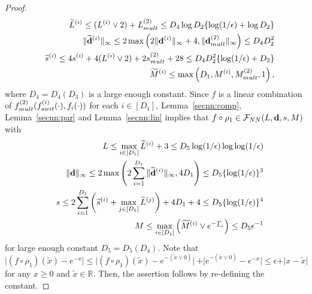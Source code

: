 \documentclass[10pt,a4paper]{amsart}
\newcommand{\bbR}{{\mathbb R}}
\newcommand{\bd}{{\bf d}}
\newcommand{\bean}{\setlength\arraycolsep{1pt}\begin{eqnarray*}}
\def\cF{\mathcal F}
\newcommand{\eean}{\end{eqnarray*}}
\begin{document}
\begin{proof}
\bean
&& \widetilde L^{(i)} \leq (L^{(i)} \vee 2) + L_{\rm mult}^{(2)} \leq D_4 \log D_2  \{ \log (1/\epsilon) + \log D_2 \} 
\\
&& \| \widetilde \bd^{(i)} \|_{\infty} \leq 2\max \left( 2\|\bd^{(i)}\|_{\infty} + 4 ,  \|\bd_{\rm mult}^{(2)}\|_{\infty}   \right) \leq D_4 D_2^2
\\
&& \widetilde s^{(i)} \leq 4 s^{(i)} + 4 (L^{(i)} \vee 2) + 2 s_{\rm mult}^{(2)} + 28  \leq D_4 D_2^{2}  \{ \log (1/\epsilon) +  D_2 \} 
\\
&& \widetilde M^{(i)} \leq \max\left(D_1, M^{(i)}, M_{\rm mult}^{(2)}, 1 \right),
\eean
where $D_4 = D_4(D_3)$ is a large enough constant.
Since $f$ is a linear combination of $f_{\rm mult}^{(2)}(f_{\rm swit}^{(i)}(\cdot) , f_{i}(\cdot))$ for each $i \in [D_1]$, Lemma~\ref{secnn:comp}, Lemma~\ref{secnn:par} and Lemma~\ref{secnn:lin} implies that $f \circ \rho_{1} \in \cF_{\rm NN}(L,\bd,s,M)$ with
\bean
&& L \leq \max_{i \in [D_1]} \widetilde L^{(i)} + 3 \leq D_5 \log(1/\epsilon) \log \log (1/\epsilon)
\\
&& \|\bd\|_{\infty} \leq 2\max\left( 2\sum_{i=1}^{D_1} \| \widetilde \bd^{(i)}\|_{\infty}, 4 D_1 \right) \leq D_5  \{ \log(1/\epsilon)\}^{3}
\\
&& s \leq 2\sum_{i=1}^{D_1}\left(\widetilde s^{(i)} +  \max_{j \in [D_1]} \widetilde L^{(j)} \right) + 4D_1 + 4 \leq D_5  \{ \log(1/\epsilon)\}^{4}
\\
&& M \leq \max_{i \in [D_1]} \left(\widetilde M^{(i)} \vee e^{-\underline{T}_i} \right) \leq D_5 \epsilon^{-1}
\eean
for large enough constant $D_5 = D_5(D_4)$.
Note that $\vert(f \circ \rho_{1})(\widetilde x) - e^{-x} \vert \leq \vert(f \circ \rho_{1})(\widetilde x) - e^{-(\widetilde x \vee 0)} \vert \ + \vert e^{-(\widetilde x \vee 0)} - e^{-x} \vert \leq \epsilon + \vert x-\widetilde x\vert$ for any $x \geq 0$ and $\widetilde x \in \bbR$.
Then, the assertion follows by re-defining the constant.
\end{proof}
\end{document}
